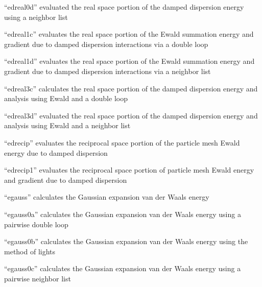 \documentclass[letterpaper,11pt,english]{sphinxmanual}
\begin{document}

“edreal0d” evaluated the real space portion of the damped
dispersion energy using a neighbor list


“edreal1c” evaluates the real space portion of the Ewald
summation energy and gradient due to damped dispersion
interactions via a double loop


“edreal1d” evaluates the real space portion of the Ewald
summation energy and gradient due to damped dispersion
interactions via a neighbor list


“edreal3c” calculates the real space portion of the damped
dispersion energy and analysis using Ewald and a double loop


“edreal3d” evaluated the real space portion of the damped
dispersion energy and analysis using Ewald and a neighbor list


“edrecip” evaluates the reciprocal space portion of the particle
mesh Ewald energy due to damped dispersion


“edrecip1” evaluates the reciprocal space portion of particle
mesh Ewald energy and gradient due to damped dispersion


“egauss” calculates the Gaussian expansion van der Waals energy


“egauss0a” calculates the Gaussian expansion van der Waals
energy using a pairwise double loop


“egauss0b” calculates the Gaussian expansion van der Waals energy
using the method of lights


“egauss0c” calculates the Gaussian expansion van der Waals
energy using a pairwise neighbor list

\end{document}
